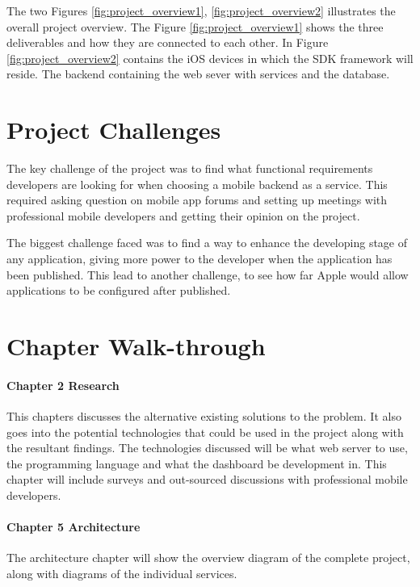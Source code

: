 The two Figures \ref{fig:project_overview1}, \ref{fig:project_overview2} illustrates the overall project overview. The Figure \ref{fig:project_overview1} shows the three deliverables and how they are connected to each other. In Figure \ref{fig:project_overview2} contains the iOS devices in which the SDK framework will reside. The backend containing the web sever with services and the database. 

\section{Project Challenges}

The key challenge of the project was to find what functional requirements developers are looking for when choosing a mobile backend as a service. This required asking question on mobile app forums and setting up meetings with professional mobile developers and getting their opinion on the project.

The biggest challenge faced was to find a way to enhance the developing stage of any application, giving more power to the developer when the application has been published. This lead to another challenge, to see how far Apple would allow applications to be configured after published.

\section{Chapter Walk-through}

\paragraph{Chapter 2 Research}

This chapters discusses the alternative existing solutions to the problem. It also goes into the potential technologies that could be used in the project along with the resultant findings. The technologies discussed will be what web server to use, the programming language and what the dashboard be development in. This chapter will include surveys and out-sourced discussions with professional mobile developers.

\paragraph{Chapter 5 Architecture}

The architecture chapter will show the overview diagram of the complete project, along with diagrams of the individual services.

